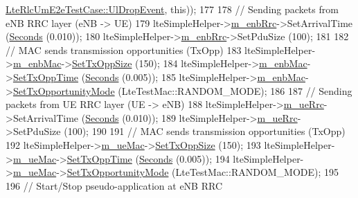 \begin{DoxyCode}
      \hyperlink{classLteRlcUmE2eTestCase_a2dd32f7d3c37f04911d45678d0141c40}{LteRlcUmE2eTestCase::UlDropEvent}, \textcolor{keyword}{this}));
177 
178   \textcolor{comment}{// Sending packets from eNB RRC layer (eNB -> UE)}
179   lteSimpleHelper->\hyperlink{classns3_1_1LteSimpleHelper_a89ce7ea3468b4cbea029490a6451052e}{m\_enbRrc}->SetArrivalTime (\hyperlink{group__timecivil_ga33c34b816f8ff6628e33d5c8e9713b9e}{Seconds} (0.010));
180   lteSimpleHelper->\hyperlink{classns3_1_1LteSimpleHelper_a89ce7ea3468b4cbea029490a6451052e}{m\_enbRrc}->SetPduSize (100);
181 
182   \textcolor{comment}{// MAC sends transmission opportunities (TxOpp)}
183   lteSimpleHelper->\hyperlink{classns3_1_1LteSimpleHelper_a953ff7bc15f6b310a13d35581c2fecef}{m\_enbMac}->\hyperlink{classns3_1_1LteTestMac_a650a080a34f7f31d97ec3a6daea651bb}{SetTxOppSize} (150);
184   lteSimpleHelper->\hyperlink{classns3_1_1LteSimpleHelper_a953ff7bc15f6b310a13d35581c2fecef}{m\_enbMac}->\hyperlink{classns3_1_1LteTestMac_aeaa7f68b716b8ee044bd7af49f4ca141}{SetTxOppTime} (\hyperlink{group__timecivil_ga33c34b816f8ff6628e33d5c8e9713b9e}{Seconds} (0.005));
185   lteSimpleHelper->\hyperlink{classns3_1_1LteSimpleHelper_a953ff7bc15f6b310a13d35581c2fecef}{m\_enbMac}->\hyperlink{classns3_1_1LteTestMac_af48f53304281f34d121eec2fecb85f6d}{SetTxOpportunityMode} (LteTestMac::RANDOM\_MODE);
186 
187   \textcolor{comment}{// Sending packets from UE RRC layer (UE -> eNB)}
188   lteSimpleHelper->\hyperlink{classns3_1_1LteSimpleHelper_a21a115de62aaa22c3278c1154057b5f2}{m\_ueRrc}->SetArrivalTime (\hyperlink{group__timecivil_ga33c34b816f8ff6628e33d5c8e9713b9e}{Seconds} (0.010));
189   lteSimpleHelper->\hyperlink{classns3_1_1LteSimpleHelper_a21a115de62aaa22c3278c1154057b5f2}{m\_ueRrc}->SetPduSize (100);
190 
191   \textcolor{comment}{// MAC sends transmission opportunities (TxOpp)}
192   lteSimpleHelper->\hyperlink{classns3_1_1LteSimpleHelper_a963987a7323f3f7b1cefbc0e0bc367bc}{m\_ueMac}->\hyperlink{classns3_1_1LteTestMac_a650a080a34f7f31d97ec3a6daea651bb}{SetTxOppSize} (150);
193   lteSimpleHelper->\hyperlink{classns3_1_1LteSimpleHelper_a963987a7323f3f7b1cefbc0e0bc367bc}{m\_ueMac}->\hyperlink{classns3_1_1LteTestMac_aeaa7f68b716b8ee044bd7af49f4ca141}{SetTxOppTime} (\hyperlink{group__timecivil_ga33c34b816f8ff6628e33d5c8e9713b9e}{Seconds} (0.005));
194   lteSimpleHelper->\hyperlink{classns3_1_1LteSimpleHelper_a963987a7323f3f7b1cefbc0e0bc367bc}{m\_ueMac}->\hyperlink{classns3_1_1LteTestMac_af48f53304281f34d121eec2fecb85f6d}{SetTxOpportunityMode} (LteTestMac::RANDOM\_MODE);
195 
196   \textcolor{comment}{// Start/Stop pseudo-application at eNB RRC}

\end{DoxyCode}
